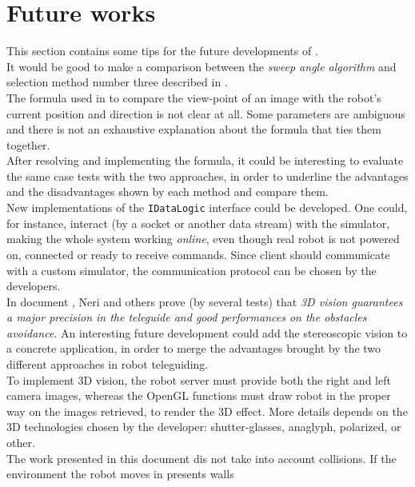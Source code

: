 \setcounter{figure}{0}
\setcounter{table}{0}
\setcounter{lstlisting}{0}

\chapter{Future works}
\label{future_works}
\minitoc

This section contains some tips for the future developments of 
\framework{}.
\\
It would be good to make a comparison between the \textit{sweep angle
algorithm} and selection method number three described in \cite{sugimoto}.
\\
The formula used in \cite{sugimoto} to compare the view-point of an image with
the robot's current position and direction is not clear at all. Some parameters
are ambiguous and there is not an exhaustive explanation about the formula that
ties them together.
\\
After resolving and implementing the formula, it could be interesting to evaluate
the same case tests with the two approaches, in order to underline the advantages
and the disadvantages shown by each method and compare them.
\\
New implementations of the \texttt{IDataLogic} interface could be 
developed. One could, for instance, interact (by a socket or another 
data stream) with the simulator, making the whole system working \textit{online},
even though real \morduc{} robot is not powered on, connected or ready
to receive commands. Since client should communicate with a custom 
simulator, the communication protocol can be chosen by the developers.
\\
In document \cite{morduc:neri}, Neri and others prove (by several tests) that \textit{3D
vision guarantees a major precision in the teleguide and good performances on the obstacles
avoidance}. An interesting future development could add the stereoscopic vision to a concrete
\framework{} application, in order to merge the advantages brought by the two different
approaches in robot teleguiding.
\\
To implement 3D vision, the robot server must provide both the right and left camera images,
whereas the OpenGL functions must draw robot in the proper way on the images retrieved, to render
the 3D effect. More details depends on the 3D technologies chosen by the developer: shutter-glasses,
anaglyph, polarized, or other.
\\
The work presented in this document dis not take into account 
collisions. If the environment the robot moves in presents walls 
